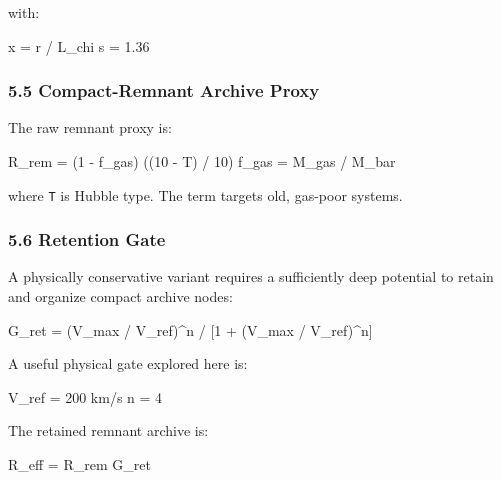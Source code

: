 \documentclass[
]{article}
\newenvironment{Shaded}{}{}
\newcommand{\NormalTok}[1]{#1}
\begin{document}
with:

\begin{Shaded}
\begin{Highlighting}[]
\NormalTok{x = r / L\_chi}
\NormalTok{s = 1.36}
\end{Highlighting}
\end{Shaded}

\subsubsection{5.5 Compact-Remnant Archive
Proxy}\label{compact-remnant-archive-proxy}

The raw remnant proxy is:

\begin{Shaded}
\begin{Highlighting}[]
\NormalTok{R\_rem = (1 {-} f\_gas) ((10 {-} T) / 10)}
\NormalTok{f\_gas = M\_gas / M\_bar}
\end{Highlighting}
\end{Shaded}

where \texttt{T} is Hubble type. The term targets old, gas-poor systems.

\subsubsection{5.6 Retention Gate}\label{retention-gate}

A physically conservative variant requires a sufficiently deep potential
to retain and organize compact archive nodes:

\begin{Shaded}
\begin{Highlighting}[]
\NormalTok{G\_ret = (V\_max / V\_ref)\^{}n / [1 + (V\_max / V\_ref)\^{}n]}
\end{Highlighting}
\end{Shaded}

A useful physical gate explored here is:

\begin{Shaded}
\begin{Highlighting}[]
\NormalTok{V\_ref = 200 km/s}
\NormalTok{n = 4}
\end{Highlighting}
\end{Shaded}

The retained remnant archive is:

\begin{Shaded}
\begin{Highlighting}[]
\NormalTok{R\_eff = R\_rem G\_ret}
\end{Highlighting}
\end{Shaded}
\end{document}
